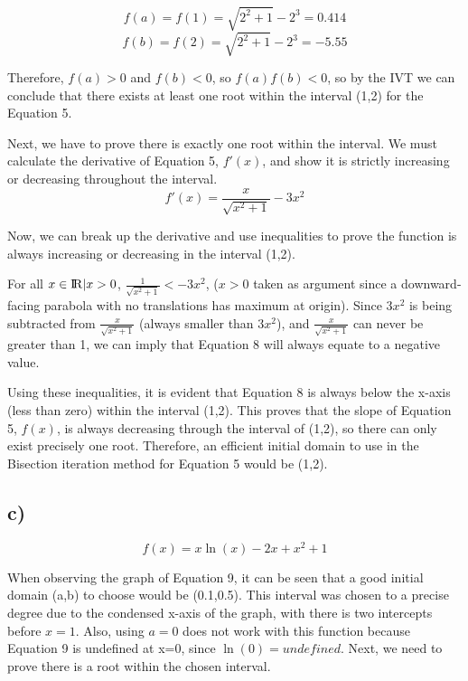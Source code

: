 \documentclass{article}
\begin{document}
    \begin{equation}
             f(a) = f(1) = \sqrt{2^2+1} -2^3 = 0.414
    \end{equation}
    \begin{equation}
        f(b) = f(2) = \sqrt{2^2+1} -2^3 = -5.55
    \end{equation}

    Therefore, $f(a) > 0$ and $f(b) < 0$, so $f(a)f(b) < 0$, so by the IVT we can conclude that there exists at least one root within the interval (1,2) for the Equation 5.

    Next, we have to prove there is exactly one root within the interval.  We must calculate the derivative of Equation 5, $f'(x)$, and show it is strictly increasing or decreasing throughout the interval.
    \begin{equation}
         f'(x) = \frac{x}{\sqrt{x^2+1}}-3x^2 
    \end{equation}

    Now, we can break up the derivative and use inequalities to prove the function is always increasing or decreasing in the interval (1,2).    
    
    For all $x \in {\rm I\!R}|x>0$, $\frac{1}{\sqrt{x^2+1}} < -3x^2$, ($x > 0$ taken as argument since a downward-facing parabola with no translations has maximum at origin).  Since $3x^2$ is being subtracted from $\frac{x}{\sqrt{x^2+1}}$ (always smaller than $3x^2$), and $\frac{x}{\sqrt{x^2+1}}$ can never be greater than 1, we can imply that Equation 8 will always equate to a negative value. 
    
    Using these inequalities, it is evident that Equation 8 is always below the x-axis (less than zero) within the interval (1,2).  This proves that the slope of Equation 5, $f(x)$, is always decreasing through the interval of (1,2), so there can only exist precisely one root.  Therefore, an efficient initial domain to use in the Bisection iteration method for Equation 5 would be (1,2).

\subsection*{c)}
    \begin{equation}
        f(x) = x\ln(x)-2x+x^2+1
    \end{equation}

    When observing the graph of Equation 9, it can be seen that a good initial domain (a,b) to choose would be (0.1,0.5).  This interval was chosen to a precise degree due to the condensed x-axis of the graph, with there is two intercepts before $x=1$.  Also, using $a=0$ does not work with this function because Equation 9 is undefined at x=0, since $\ln(0) = undefined$. Next, we need to prove there is a root within the chosen interval.
\end{document}
